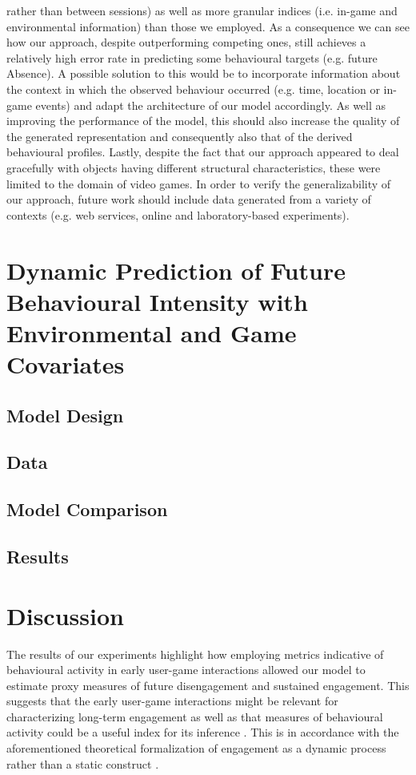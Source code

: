 rather than between sessions) as well as more granular indices (i.e. in-game and environmental information) than those we employed. As a consequence we can see how our approach, despite outperforming competing ones, still achieves a relatively high error rate in predicting some behavioural targets (e.g. future Absence). A possible solution to this would be to incorporate information about the context in which the observed behaviour occurred (e.g. time, location or in-game events) and adapt the architecture of our model accordingly. As well as improving the performance of the model, this should also increase the quality of the generated representation and consequently also that of the derived behavioural profiles. Lastly, despite the fact that our approach appeared to deal gracefully  with objects having different structural characteristics, these were limited to the domain of video games. In order to verify the generalizability of our approach, future work should include data generated from a variety of contexts (e.g. web services, online and laboratory-based experiments).

\section{Dynamic Prediction of Future Behavioural Intensity with Environmental and Game Covariates}
\label{model_architecture_3}
\lorem

\subsection{Model Design}


\subsection{Data}
\lorem

\subsection{Model Comparison}
\lorem

\subsection{Results}
\lorem


\section{Discussion}
The results of our experiments highlight how employing metrics indicative of behavioural activity in early user-game interactions allowed our model to estimate proxy measures of future disengagement and sustained engagement. This suggests that the early user-game interactions might be relevant for characterizing long-term engagement as well as that measures of behavioural activity could be a useful index for its inference \cite{milovsevic2017early, mirza2013does}.
This is in accordance with the aforementioned theoretical formalization of engagement as a dynamic process rather than a static construct \cite{o2008user}. 